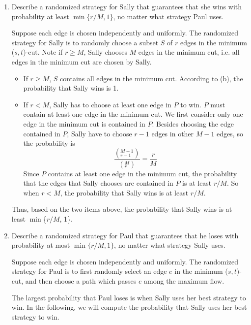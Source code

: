 \documentclass[letterpaper,11pt]{article}
\begin{document}
\begin{enumerate}
\begin{enumerate}
  \item 
    Describe a randomized strategy for Sally that guarantees that she wins with
    probability at least $\min\{r/M,1\}$, no matter what strategy Paul uses.
    \begin{solution}
      Suppose each edge is chosen independently and uniformly. The randomized
strategy for Sally is to randomly choose a subset $S$ of $r$ edges in the
minimum ($s, t$)-cut. Note if $r \ge M$, Sally chooses $M$ edges in the minimum
cut, i.e. all edges in the minimum cut are chosen by Sally.
\begin{itemize}
\item If $r \ge M$, $S$ contains all edges in the minimum cut. According to
  (b), the probability that Sally wins is 1.
\item If $r < M$, Sally has to choose at least one edge in $P$ to win. $P$ must
  contain at least one edge in the minimum cut. We first consider only one edge
  in the minimum cut is contained in $P$. Besides choosing the edge contained
  in $P$, Sally have to choose $r-1$ edges in other $M-1$ edges, so  the
  probability is
\[
\frac{\left(^{M-1}_{r-1}\right)}{\left(^M_r\right)} = \frac{r}{M}
\] 
Since $P$ contains at least one edge in the minimum cut, the probability that
the edges that Sally chooses are contained in $P$ is at least $r/M$. So when $r
< M$, the probability that Sally wins is at least $r/M$.
\end{itemize}
Thus, based on the two items above, the probability that Sally wins is at least
$\min$\{$r/M$, 1\}.

    \end{solution}
  \item 
    Describe a randomized strategy for Paul that guarantees that he loses with
    probability at most $\min\{r/M,1\}$, no matter what strategy Sally uses.
    \begin{solution}
Suppose each edge is chosen independently and uniformly. The randomized
strategy for Paul is to first randomly select an edge $e$ in the 
minimum ($s, t$)-cut, and then choose a path which passes $e$ among the maximum
flow. 

The largest probability that Paul loses is when Sally uses her best strategy to
win. In the following, we will compute the probability that Sally uses her best
strategy to win. 


\end{solution}
\end{enumerate}
\end{enumerate}
\end{document}
